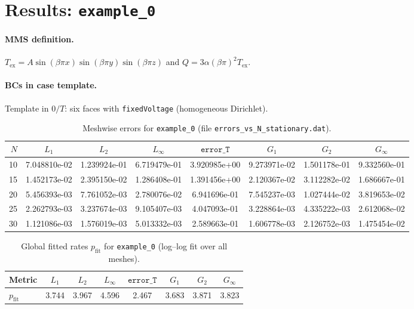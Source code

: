 \documentclass[11pt,a4paper]{article}
\begin{document}
\section{Results: \texttt{example\_0}}
\paragraph{MMS definition.}
$T_{\mathrm{ex}} = A\sin(\beta\pi x)\sin(\beta\pi y)\sin(\beta\pi z)$ and $Q = 3\alpha(\beta\pi)^2 T_{\mathrm{ex}}$.
\paragraph{BCs in case template.}
Template in $0/T$: six faces with \texttt{fixedVoltage} (homogeneous Dirichlet).
\begin{table}[htbp]
\centering
\caption{Meshwise errors for \texttt{example\_0} (file \texttt{errors\_vs\_N\_stationary.dat}).}
\label{tab:errors-example-0}
\scriptsize
\begin{tabular}{rccccccc}
\toprule
$N$ & $L_1$ & $L_2$ & $L_\infty$ & $\texttt{error\_T}$ & $G_1$ & $G_2$ & $G_\infty$ \\
\midrule
10 & 7.048810e-02 & 1.239924e-01 & 6.719479e-01 & 3.920985e+00 & 9.273971e-02 & 1.501178e-01 & 9.332560e-01 \\
15 & 1.452173e-02 & 2.395150e-02 & 1.286408e-01 & 1.391456e+00 & 2.120367e-02 & 3.112282e-02 & 1.686667e-01 \\
20 & 5.456393e-03 & 7.761052e-03 & 2.780076e-02 & 6.941696e-01 & 7.545237e-03 & 1.027444e-02 & 3.819653e-02 \\
25 & 2.262793e-03 & 3.237674e-03 & 9.105407e-03 & 4.047093e-01 & 3.228864e-03 & 4.335222e-03 & 2.612068e-02 \\
30 & 1.121086e-03 & 1.576019e-03 & 5.013332e-03 & 2.589663e-01 & 1.606778e-03 & 2.126752e-03 & 1.475454e-02 \\
\bottomrule
\end{tabular}
\end{table}
\begin{table}[htbp]
\centering
\caption{Global fitted rates $p_{\mathrm{fit}}$ for \texttt{example\_0} (log--log fit over all meshes).}
\label{tab:fit-example-0}
\small
\begin{tabular}{lccccccc}
\toprule
Metric & $L_1$ & $L_2$ & $L_\infty$ & $\texttt{error\_T}$ & $G_1$ & $G_2$ & $G_\infty$ \\
\midrule
$p_{\mathrm{fit}}$ & 3.744 & 3.967 & 4.596 & 2.467 & 3.683 & 3.871 & 3.823 \\
\bottomrule
\end{tabular}
\end{table}
\end{document}
